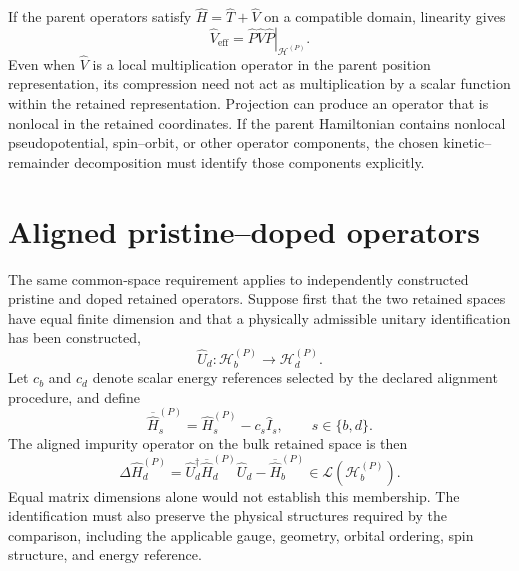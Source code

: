 If the parent operators satisfy
$\hat H=\hat T+\hat V$ on a compatible domain, linearity gives
\begin{equation}
    \hat V_{\mathrm{eff}}
    =
    \left.
        \hat P\hat V\hat P
    \right|_{\mathcal H^{(P)}}.
\end{equation}
Even when $\hat V$ is a local multiplication operator in the parent position
representation, its compression need not act as multiplication by a scalar
function within the retained representation. Projection can produce an
operator that is nonlocal in the retained coordinates. If the parent
Hamiltonian contains nonlocal pseudopotential, spin--orbit, or other operator
components, the chosen kinetic--remainder decomposition must identify those
components explicitly.

\section{Aligned pristine--doped operators}


The same common-space requirement applies to independently constructed
pristine and doped retained operators. Suppose first that the two retained
spaces have equal finite dimension and that a physically admissible unitary
identification has been constructed,
\begin{equation}
    \hat U_d:
    \mathcal H_b^{(P)}
    \longrightarrow
    \mathcal H_d^{(P)}.
\end{equation}
Let $c_b$ and $c_d$ denote scalar energy references selected by the declared
alignment procedure, and define
\begin{equation}
    \overline{\hat H}_s^{(P)}
    =
    \hat H_s^{(P)}-c_s\hat I_s,
    \qquad
    s\in\{b,d\}.
\end{equation}
The aligned impurity operator on the bulk retained space is then
\begin{equation}
    \Delta\hat H_d^{(P)}
    =
    \hat U_d^\dagger
    \overline{\hat H}_d^{(P)}
    \hat U_d
    -
    \overline{\hat H}_b^{(P)}
    \in
    \mathcal L\!\left(\mathcal H_b^{(P)}\right).
\end{equation}
Equal matrix dimensions alone would not establish this membership. The
identification must also preserve the physical structures required by the
comparison, including the applicable gauge, geometry, orbital ordering, spin
structure, and energy reference.

